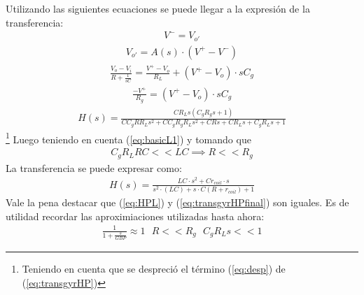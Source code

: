 \documentclass[a4paper]{article}
\begin{document}
Utilizando las siguientes ecuaciones se puede llegar a la expresión de la transferencia:
\begin{align}V^- = V_{o'}\end{align}
\begin{align}V_{o'} = A(s)\cdot (V^+-V^-)\end{align}
\begin{align}\frac{V_o-V_i}{R+\frac{1}{sC}} = \frac{V^+-V_o}{R_L}+(V^+-V_o)\cdot sC_g\end{align}
\begin{align}\frac{-V^+}{R_g}=(V^+-V_o)\cdot sC_g\end{align}
\begin{align} H(s) = \frac{C R_L s \left(C_g R_g s + 1\right)}{C C_g R R_L s^{2} + C C_g R_g R_L s^{2} + C R s + C R_L s + C_g R_L s + 1}\label{eq:transgyrHP}\end{align}\footnote{Teniendo en cuenta que se despreció el término (\ref{eq:desp}) de (\ref{eq:transgyrHP})}
Luego teniendo en cuenta (\ref{eq:basicL1}) y tomando que
\begin{align} C_gR_LRC<<LC \implies R<<R_g \end{align}
La transferencia  se puede expresar como:
 \begin{align} H(s) = \frac{LC\cdot s^2+Cr_{coil}\cdot s}{s^2 \cdot (LC)+s\cdot C(R+r_{coil})+1}\label{eq:transgyrHPfinal} 
\end{align}
Vale la pena destacar que (\ref{eq:HPL}) y (\ref{eq:transgyrHPfinal}) son iguales.
Es de utilidad recordar las aproximiaciones utilizadas hasta ahora:
\begin{align}  \frac{1}{1+\frac{s}{GBP}}\approx 1  \ \ \ R<<R_g \ \ \ C_gR_Ls << 1 \label{eq:basicL2}\end{align}
\end{document}
